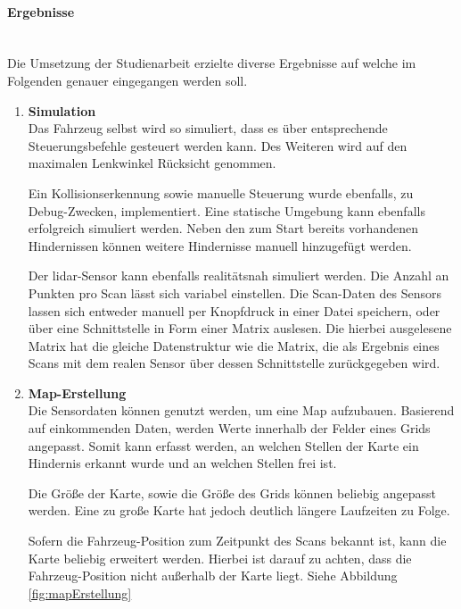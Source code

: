 \paragraph{Ergebnisse} \mbox{}\\
Die Umsetzung der Studienarbeit erzielte diverse Ergebnisse auf welche im Folgenden genauer eingegangen werden soll.

\begin{enumerate}[leftmargin=*]
    \item \textbf{Simulation} \\
    Das Fahrzeug selbst wird so simuliert, dass es über entsprechende Steuerungsbefehle gesteuert werden kann.
    Des Weiteren wird auf den maximalen Lenkwinkel Rücksicht genommen.
    
    Ein Kollisionserkennung sowie manuelle Steuerung wurde ebenfalls, zu Debug-Zwecken, implementiert.
    Eine statische Umgebung kann ebenfalls erfolgreich simuliert werden.
    Neben den zum Start bereits vorhandenen Hindernissen können weitere Hindernisse manuell hinzugefügt werden.
    
    Der \ac{lidar}-Sensor kann ebenfalls realitätsnah simuliert werden.
    Die Anzahl an Punkten pro Scan lässt sich variabel einstellen.
    Die Scan-Daten des Sensors lassen sich entweder manuell per Knopfdruck in einer Datei speichern, 
    oder über eine Schnittstelle in Form einer Matrix auslesen.
    Die hierbei ausgelesene Matrix hat die gleiche Datenstruktur wie die Matrix, 
    die als Ergebnis eines Scans mit dem realen Sensor über dessen Schnittstelle zurückgegeben wird.

    \item \textbf{Map-Erstellung} \\
    Die Sensordaten können genutzt werden, um eine Map aufzubauen.
    Basierend auf einkommenden Daten, werden Werte innerhalb der Felder eines Grids angepasst.
    Somit kann erfasst werden, an welchen Stellen der Karte ein Hindernis erkannt wurde und an welchen Stellen frei ist.
    
    Die Größe der Karte, sowie die Größe des Grids können beliebig angepasst werden.
    Eine zu große Karte hat jedoch deutlich längere Laufzeiten zu Folge.

    Sofern die Fahrzeug-Position zum Zeitpunkt des Scans bekannt ist, kann die Karte beliebig erweitert werden.
    Hierbei ist darauf zu achten, dass die Fahrzeug-Position nicht außerhalb der Karte liegt.
    Siehe Abbildung \ref{fig:mapErstellung}


\end{enumerate}
